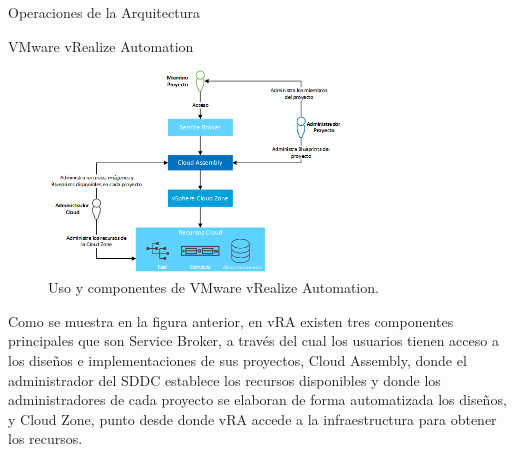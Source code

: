 \begin{subsection}{Operaciones de la Arquitectura}
\begin{subsubsection}{VMware vRealize Automation}
        \begin{figure}[h]
            \centering
            \includegraphics[width=0.7\textwidth]{imaxes/vRealize_pruebaconcepto/ComponentesVRA.png}
            \caption{Uso y componentes de VMware vRealize Automation.}
            \label{fig:vra-components}
        \end{figure}
        \FloatBarrier
        Como se muestra en la figura anterior, en vRA existen tres componentes principales que son Service Broker, a través del cual los usuarios tienen acceso a los diseños e implementaciones de sus proyectos, Cloud Assembly, donde el administrador del SDDC establece los recursos disponibles y donde los administradores de cada proyecto se elaboran de forma automatizada los diseños, y Cloud Zone, punto desde donde vRA accede a la infraestructura para obtener los recursos.

\end{subsubsection}
\end{subsection}
